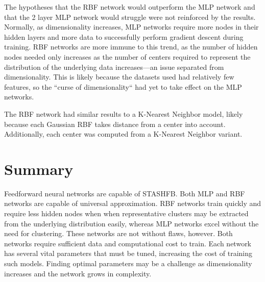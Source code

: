 \documentclass[twoside,11pt]{article}
\begin{document}
	The hypotheses that the RBF network would outperform the MLP network and that the 2 layer MLP network would struggle were not reinforced by the results. Normally, as dimensionality increases, MLP networks require more nodes in their hidden layers and more data to successfully perform gradient descent during training. RBF networks are more immune to this trend, as the number of hidden nodes needed only increases as the number of centers required to represent the distribution of the underlying data increases---an issue separated from dimensionality. This is likely because the datasets used had relatively few features, so the ``curse of dimensionality`` had yet to take effect on the MLP networks.
	
	The RBF network had similar results to a K-Nearest Neighbor model, likely because each Gaussian RBF takes distance from a center into account. Additionally, each center was computed from a K-Nearest Neighbor variant.

\section{Summary}

	Feedforward neural networks are capable of STASHFB. Both MLP and RBF networks are capable of universal approximation. RBF networks train quickly and require less hidden nodes when when representative clusters may be extracted from the underlying distribution easily, whereas MLP networks excel without the need for clustering. These networks are not without flaws, however. Both networks require sufficient data and computational cost to train. Each network has several vital parameters that must be tuned, increasing the cost of training such models. Finding optimal parameters may be a challenge as dimensionality increases and the network grows in complexity. 


\end{document}
